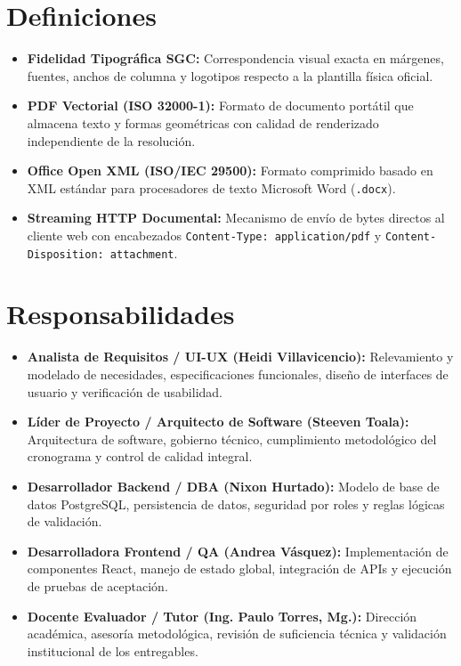 \documentclass[12pt,a4paper]{article}
\begin{document}
\section{Definiciones}
\begin{itemize}[leftmargin=1.5em, itemsep=2pt]
    \item \textbf{Fidelidad Tipográfica SGC:} Correspondencia visual exacta en márgenes, fuentes, anchos de columna y logotipos respecto a la plantilla física oficial.
    \item \textbf{PDF Vectorial (ISO 32000-1):} Formato de documento portátil que almacena texto y formas geométricas con calidad de renderizado independiente de la resolución.
    \item \textbf{Office Open XML (ISO/IEC 29500):} Formato comprimido basado en XML estándar para procesadores de texto Microsoft Word (\texttt{.docx}).
    \item \textbf{Streaming HTTP Documental:} Mecanismo de envío de bytes directos al cliente web con encabezados \texttt{Content-Type: application/pdf} y \texttt{Content-Disposition: attachment}.
\end{itemize}

\section{Responsabilidades}
\begin{itemize}[leftmargin=1.5em, itemsep=2pt]
    \item \textbf{Analista de Requisitos / UI-UX (Heidi Villavicencio):} Relevamiento y modelado de necesidades, especificaciones funcionales, diseño de interfaces de usuario y verificación de usabilidad.
    \item \textbf{Líder de Proyecto / Arquitecto de Software (Steeven Toala):} Arquitectura de software, gobierno técnico, cumplimiento metodológico del cronograma y control de calidad integral.
    \item \textbf{Desarrollador Backend / DBA (Nixon Hurtado):} Modelo de base de datos PostgreSQL, persistencia de datos, seguridad por roles y reglas lógicas de validación.
    \item \textbf{Desarrolladora Frontend / QA (Andrea Vásquez):} Implementación de componentes React, manejo de estado global, integración de APIs y ejecución de pruebas de aceptación.
    \item \textbf{Docente Evaluador / Tutor (Ing. Paulo Torres, Mg.):} Dirección académica, asesoría metodológica, revisión de suficiencia técnica y validación institucional de los entregables.
\end{itemize}
\end{document}
